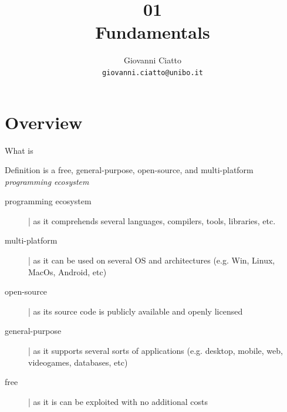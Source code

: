 \documentclass[presentation]{beamer}
\title[\lecturecode{01}]{01 \\ \dotnet Fundamentals}
\author[Giovanni Ciatto]{Giovanni Ciatto\\\texttt{giovanni.ciatto@unibo.it}}
\begin{document}
\frame[label=coverpage]{\titlepage}

\section{\dotnet Overview}

\begin{frame}{What is \dotnet}
    \begin{block}{Definition}\centering
        \dotnet is a free, general-purpose, open-source, and multi-platform \emph{programming ecosystem}
    \end{block}  

    \vfill

    \begin{description}
        \item[programming ecosystem] | as it comprehends several languages, compilers, tools, libraries, etc.
        
        \vfill

        \item[multi-platform] | as it can be used on several OS and architectures (e.g. Win, Linux, MacOs, Android, etc)
        
        \vfill

        \item[open-source] | as its source code is publicly available and openly licensed
        
        \vfill

        \item[general-purpose] | as it supports several sorts of applications (e.g. desktop, mobile, web, videogames, databases, etc)
        
        \vfill

        \item[free] | as it is can be exploited with no additional costs
    \end{description}
\end{frame}
\end{document}
